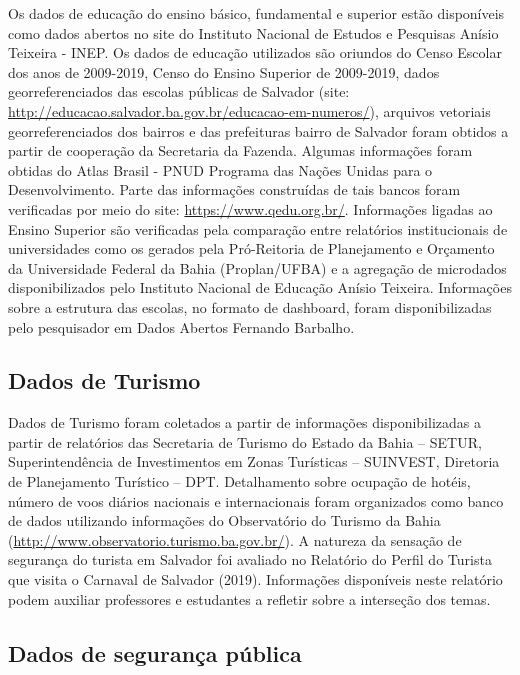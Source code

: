 \documentclass[
]{book}
\begin{document}
Os dados de educação do ensino básico, fundamental e superior estão disponíveis como dados abertos no site do Instituto Nacional de Estudos e Pesquisas Anísio Teixeira - INEP. Os dados de educação utilizados são oriundos do Censo Escolar dos anos de 2009-2019, Censo do Ensino Superior de 2009-2019, dados georreferenciados das escolas públicas de Salvador (site: \url{http://educacao.salvador.ba.gov.br/educacao-em-numeros/}), arquivos vetoriais georreferenciados dos bairros e das prefeituras bairro de Salvador foram obtidos a partir de cooperação da Secretaria da Fazenda. Algumas informações foram obtidas do Atlas Brasil - PNUD Programa das Nações Unidas para o Desenvolvimento. Parte das informações construídas de tais bancos foram verificadas por meio do site: \url{https://www.qedu.org.br/}. Informações ligadas ao Ensino Superior são verificadas pela comparação entre relatórios institucionais de universidades como os gerados pela Pró-Reitoria de Planejamento e Orçamento da Universidade Federal da Bahia (Proplan/UFBA) e a agregação de microdados disponibilizados pelo Instituto Nacional de Educação Anísio Teixeira. Informações sobre a estrutura das escolas, no formato de dashboard, foram disponibilizadas pelo pesquisador em Dados Abertos Fernando Barbalho.

\hypertarget{dados-de-turismo}{%
\subsection{Dados de Turismo}\label{dados-de-turismo}}

Dados de Turismo foram coletados a partir de informações disponibilizadas a partir de relatórios das Secretaria de Turismo do Estado da Bahia -- SETUR, Superintendência de Investimentos em Zonas Turísticas -- SUINVEST, Diretoria de Planejamento Turístico -- DPT. Detalhamento sobre ocupação de hotéis, número de voos diários nacionais e internacionais foram organizados como banco de dados utilizando informações do Observatório do Turismo da Bahia (\url{http://www.observatorio.turismo.ba.gov.br/}). A natureza da sensação de segurança do turista em Salvador foi avaliado no Relatório do Perfil do Turista que visita o Carnaval de Salvador (2019). Informações disponíveis neste relatório podem auxiliar professores e estudantes a refletir sobre a interseção dos temas.

\hypertarget{dados-de-seguranuxe7a-puxfablica}{%
\subsection{Dados de segurança pública}\label{dados-de-seguranuxe7a-puxfablica}}
\end{document}
